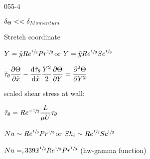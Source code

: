 \begin{mitframe}{055-4}
        
\begin{listone}
\item $\blthick_{\dimltemp}<<\blthick_{Momentum}$
   \item Stretch coordinate
   		\begin{listtwo}
        	\item $Y=\tilde{y}\reynolds^{\sfrac{1}{2}}\prandtl^{\sfrac{1}{3}}$or $Y=\tilde{y}\reynolds^{\sfrac{1}{3}}\schmidt^{\sfrac{1}{3}}$
            \item $\tilde{\torque}_{\theta}\dfrac{\partial\dimltemp}{\partial\tilde{\disp}}-\dfrac{\mathrm{d}\hat{\torque}_{\theta}}{\mathrm{d}\tilde{\disp}}{\dfrac{Y^2}{2}}\dfrac{\partial\dimltemp}{\partial{Y}}=\dfrac{\partial^2\dimltemp}{\partial{Y}^2}$
            	\begin{listthree}
                \item scaled shear stress at wall:
                		\begin{listfour}
                        	\item $\hat{\torque}_{\theta}=\reynolds^{-\sfrac{1}{2}}\dfrac{\length}{\chempot\uvel}\torque_{\theta}$
                            
                        \end{listfour}
                \end{listthree}
        \end{listtwo}
\item $\nusselt\sim\reynolds^{\sfrac{1}{3}}\prandtl^{\sfrac{1}{3}}$or $\sherwood_{\state}\sim\reynolds^{\sfrac{1}{2}}\schmidt^{\sfrac{1}{3}}$
\item $\nusselt=,339\tilde{\disp}^{\sfrac{1}{2}}\reynolds^{\sfrac{1}{2}}\prandtl^{\sfrac{1}{3}}$ (hw-gamma function)
\end{listone}
\end{mitframe}